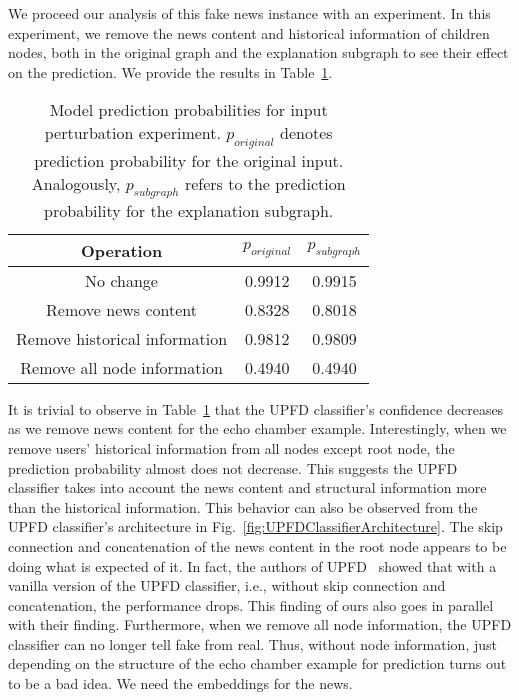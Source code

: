 We proceed our analysis of this fake news instance with an experiment. In this experiment, we remove the news content and historical information of children nodes, both in the original graph and the explanation subgraph to see their effect on the prediction. We provide the results in Table~\ref{tab:echoChamberFeatureRemovalExperimentResults}.\\
\begin{table}
    \centering
    \begin{tabular}{c | c | c}
        \textbf{Operation}            & $p_{original}$ & $p_{subgraph}$ \\
        \hline
        No change                     & 0.9912         & 0.9915         \\
        \hline
        Remove news content           & 0.8328         & 0.8018         \\
        \hline
        Remove historical information & 0.9812         & 0.9809         \\
        \hline
        Remove all node information   & 0.4940         & 0.4940         \\
    \end{tabular}
    \caption[Model prediction probabilities for input perturbation experiment.]{Model prediction probabilities for input perturbation experiment. $p_{original}$ denotes prediction probability for the original input. Analogously, $p_{subgraph}$ refers to the prediction probability for the explanation subgraph.}
    \label{tab:echoChamberFeatureRemovalExperimentResults}
\end{table}
It is trivial to observe in Table~\ref{tab:echoChamberFeatureRemovalExperimentResults} that the UPFD classifier's confidence decreases as we remove news content for the echo chamber example. Interestingly, when we remove users' historical information from all nodes except root node, the prediction probability almost does not decrease. This suggests the UPFD classifier takes into account the news content and structural information more than the historical information. This behavior can also be observed from the UPFD classifier's architecture in Fig.~\ref{fig:UPFDClassifierArchitecture}. The skip connection and concatenation of the news content in the root node appears to be doing what is expected of it. In fact, the authors of UPFD~\parencite{UPFD_Dataset_Shu} showed that with a vanilla version of the UPFD classifier, i.e., without skip connection and concatenation, the performance drops. This finding of ours also goes in parallel with their finding. Furthermore, when we remove all node information, the UPFD classifier can no longer tell fake from real. Thus, without node information, just depending on the structure of the echo chamber example for prediction turns out to be a bad idea. We need the embeddings for the news.\\
